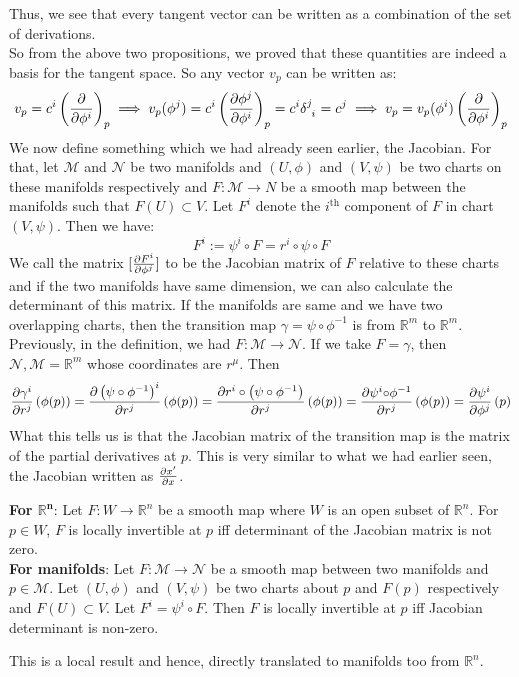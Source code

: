 Thus, we see that every tangent vector can be written as a combination of the set of derivations.\\[0.2cm]
So from the above two propositions, we proved that these quantities are indeed a basis for the tangent space. So any vector $v_p$ can be written as: $$v_p = c^i \brac{\pdv{\phi^i}}_p \implies v_p(\phi^j) = c^i \brac{\pdv{\phi^j}{\phi^i}}_p = c^i \tensor{\delta}{^j _i} = c^j \implies v_p = v_p(\phi^i) \brac{\pdv{\phi^i}}_p$$
We now define something which we had already seen earlier, the Jacobian. For that, let $\mathcal{M}$ and $\mathcal{N}$ be two manifolds and $(U,\phi)$ and $(V,\psi)$ be two charts on these manifolds respectively and $F: \mathcal{M}\rightarrow N$ be a smooth map between the manifolds such that $F(U) \subset V$. Let $F^i$ denote the $i^{\text{th}}$ component of $F$ in chart $(V,\psi)$. Then we have:
$$F^i := \psi^i \circ F = r^i \circ \psi \circ F$$
We call the matrix $[\pdv{F^i}{\phi^j}]$ to be the Jacobian matrix of $F$ relative to these charts and if the two manifolds have same dimension, we can also calculate the determinant of this matrix. If the manifolds are same and we have two overlapping charts, then the transition map $\gamma = \psi \circ \phi^{-1}$ is from $\mathbb{R}^m$ to $\mathbb{R}^m$. Previously, in the definition, we had $F:\mathcal{M}\rightarrow \mathcal{N}$. If we take $F= \gamma$, then $\mathcal{N},\mathcal{M} = \mathbb{R}^m$ whose coordinates are $r^\mu$. Then
$$\pdv{\gamma^i}{r^j}\left( \phi(p) \right) = \pdv{\left( \psi \circ \phi^{-1} \right)^i}{r^j}\left( \phi(p) \right) =\pdv{r^i \circ \left( \psi \circ \phi^{-1} \right)}{r^j}\left( \phi(p) \right) = \pdv{ \psi^i { \circ \phi^{-1}}}{r^j}\left( \phi(p) \right) = \pdv{\psi^i}{\phi^j}\left( p \right)$$
What this tells us is that the Jacobian matrix of the transition map is the matrix of the partial derivatives at $p$. This is very similar to what we had earlier seen, the Jacobian written as $\pdv{x'}{x}$. 

\begin{theorem}
  \textbf{For $\mathbf{\mathbb{R}^n}$}: Let $F: W\rightarrow \mathbb{R}^n$ be a smooth map where $W$ is an open subset of $\mathbb{R}^n$. For $p\in W$, $F$ is locally invertible at $p$ iff determinant of the Jacobian matrix is not zero. \\[0.2cm]
  \textbf{For manifolds}: Let $F:\mathcal{M}\rightarrow \mathcal{N}$ be a smooth map between two manifolds and $p\in \mathcal{M}$. Let $(U,\phi)$ and $(V,\psi)$ be two charts about $p$ and $F(p)$ respectively and $F(U)\subset V$. Let $F^i = \psi^i \circ F$. Then $F$ is locally invertible at $p$ iff Jacobian determinant is non-zero.
\end{theorem}
This is a local result and hence, directly translated to manifolds too from $\mathbb{R}^n$.
